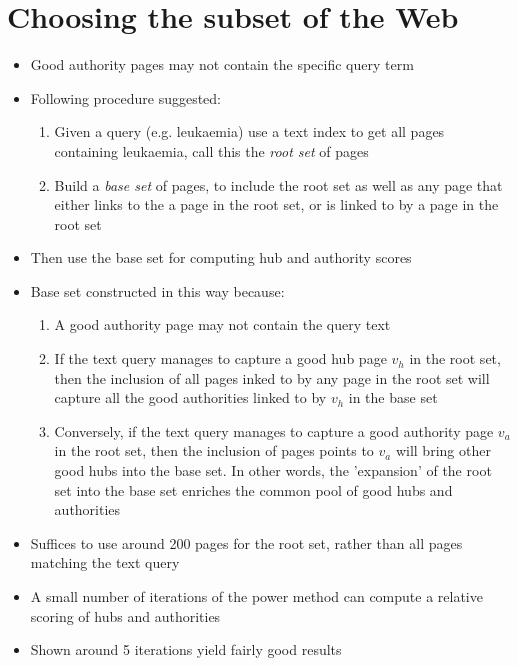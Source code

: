 \documentclass[11pt]{report}
\begin{document}
\section{Choosing the subset of the Web}
\begin{itemize}
\item Good authority pages may not contain the specific query term
\item Following procedure suggested: 
\begin{enumerate}
\item Given a query (e.g. leukaemia) use a text index to get all pages containing leukaemia, call this the \textit{root set} of pages
\item Build a \textit{base set} of pages, to include the root set as well as any page that either links to the a page in the root set, or is linked to by a page in the root set
\end{enumerate}
\item Then use the base set for computing hub and authority scores
\item Base set constructed in this way because:
\begin{enumerate}
\item A good authority page may not contain the query text
\item If the text query manages to capture a good hub page $v_h$ in the root set, then the inclusion of all pages inked to by any page in the root set will capture all the good authorities linked to by $v_h$ in the base set
\item Conversely, if the text query manages to capture a good authority page $v_a$ in the root set, then the inclusion of pages points to $v_a$ will bring other good hubs into the base set. In other words, the 'expansion' of the root set into the base set enriches the common pool of good hubs and authorities
\end{enumerate}
\item Suffices to use around 200 pages for the root set, rather than all pages matching the text query
\item A small number of iterations of the power method can compute a relative scoring of hubs and authorities
\item Shown around 5 iterations yield fairly good results
\end{itemize}
\end{document}
